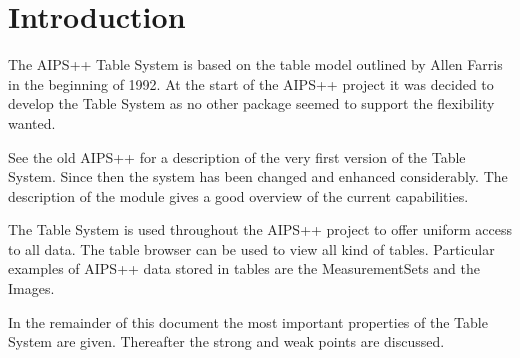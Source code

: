\section{Introduction}
The AIPS++ Table System is based on the table model outlined
by Allen Farris in the beginning of 1992. At the start of the AIPS++
project it was decided to develop the Table System as no other package
seemed to support the flexibility wanted.

See the old AIPS++
for a description of the very first version of the Table System.
Since then the system has been changed and enhanced considerably.
The description of the
module gives a good overview of the current capabilities.

The Table System is used throughout the AIPS++ project to offer
uniform access to all data. The table browser can be used to view
all kind of tables.
Particular examples of AIPS++ data stored
in tables are the MeasurementSets and the Images.

In the remainder of this document the most important properties of the
Table System are given. Thereafter the strong and weak points are
discussed. 

